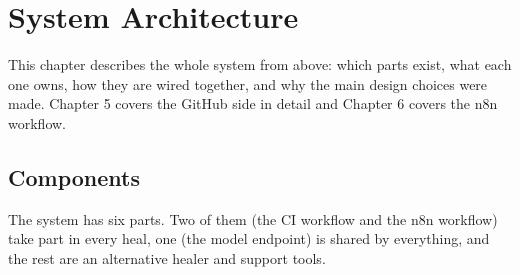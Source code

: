 
\chapter{System Architecture}

This chapter describes the whole system from above: which parts exist, what each one owns, how they are wired together, and why the main design choices were made. Chapter 5 covers the GitHub side in detail and Chapter 6 covers the n8n workflow.

\section{Components}



The system has six parts. Two of them (the CI workflow and the n8n workflow) take part in every heal, one (the model endpoint) is shared by everything, and the rest are an alternative healer and support tools.

